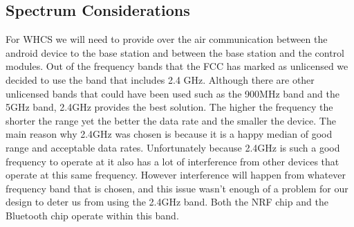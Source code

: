 \subsection{Spectrum Considerations}
For WHCS we will need to provide over the air communication between the android
device to the base station and between the base station and the control
modules. Out of the frequency bands that the FCC has marked as unlicensed we
decided to use the band that includes 2.4 GHz. Although there are other
unlicensed bands that could have been used such as the 900MHz band and the 5GHz
band, 2.4GHz provides the best solution. The higher the frequency the shorter
the range yet the better the data rate and the smaller the device. The main
reason why 2.4GHz was chosen is because it is a happy median of good range and
acceptable data rates. Unfortunately because 2.4GHz is such a good frequency to
operate at it also has a lot of interference from other devices that operate at
this same frequency. However interference will happen from whatever frequency
band that is chosen, and this issue wasn{}'t enough of a problem for our design
to deter us from using the 2.4GHz band. Both the NRF chip and the Bluetooth
chip operate within this band.
